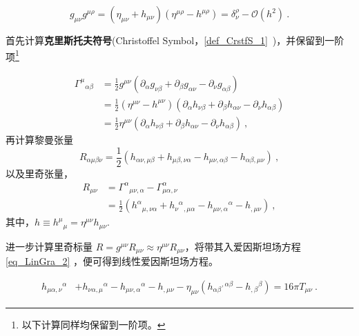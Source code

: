 \begin{equation}
g_{\mu\nu}g^{\mu\rho} = (\eta_{\mu\nu} + h_{\mu\nu})(\eta^{\mu\rho} - h^{\mu\rho}) = \delta^{\rho}_{\nu} - \mathcal{O}(h^2)~.
\end{equation}

首先计算\textbf{克里斯托夫符号}(Christoffel Symbol，\autoref{def_CrstfS_1}~)，并保留到一阶项\footnote{以下计算同样均保留到一阶项。}

\begin{equation}
\begin{aligned}
\Gamma^{\mu}{}_{\alpha\beta}&=\frac{1}{2}g^{\mu\nu}(\partial_\alpha g_{\nu\beta} + \partial_\beta g_{\alpha\nu} - \partial_\nu g_{\alpha\beta})\\
&=\frac{1}{2}(\eta^{\mu\nu} - h^{\mu\nu})(\partial_\alpha h_{\nu\beta} + \partial_\beta h_{\alpha\nu} - \partial_\nu h_{\alpha\beta})\\
&=\frac{1}{2}\eta^{\mu\nu} (\partial_\alpha h_{\nu\beta} + \partial_\beta h_{\alpha\nu} - \partial_\nu h_{\alpha\beta})~,
\end{aligned}
\end{equation}
再计算黎曼张量
\begin{equation}
R_{\alpha \mu \beta \nu}=\frac{1}{2}\left(h_{\alpha \nu, \mu \beta}+h_{\mu \beta, \nu \alpha}-h_{\mu \nu, \alpha \beta}-h_{\alpha \beta, \mu \nu}\right)~,
\end{equation}
以及里奇张量，
\begin{equation}
\begin{aligned}
R_{\mu\nu} &= \Gamma^{\alpha}{}_{\mu\nu,\alpha} - \Gamma^{\alpha}_{\mu\alpha,\nu}\\
&=\frac{1}{2}\left(h^{\alpha}{}_{\mu, \nu \alpha} + h_{\nu}{ }^{\alpha}{ }_{, \mu \alpha}-h_{\mu \nu, \alpha}{ }^{\alpha}-h_{, \mu \nu}\right)~,
\end{aligned}
\end{equation}
其中，$h\equiv h^{\mu}{}_{\mu}=\eta^{\mu\nu}h_{\mu\nu}$.

进一步计算里奇标量 $R = g^{\mu\nu}R_{\mu\nu}\approx \eta^{\mu\nu}R_{\mu\nu}$，将带其入爱因斯坦场方程\autoref{eq_LinGra_2}  ，便可得到线性爱因斯坦场方程。

\begin{equation}
\begin{aligned}
h_{\mu \alpha, \nu}{ }^{\alpha} &+h_{\nu \alpha, \mu}{ }^{\alpha}-h_{\mu \nu, \alpha}{ }^{\alpha}-h_{, \mu \nu} -\eta_{\mu \nu}\left(h_{\alpha \beta}{ }^{, \alpha \beta}-h_{, \beta}{ }^{\beta}\right)= 16 \pi T_{\mu \nu}~.
\end{aligned}
\end{equation}

